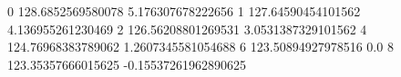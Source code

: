0 128.6852569580078 5.176307678222656
1 127.64590454101562 4.136955261230469
2 126.56208801269531 3.0531387329101562
4 124.76968383789062 1.2607345581054688
6 123.50894927978516 0.0
8 123.35357666015625 -0.15537261962890625
